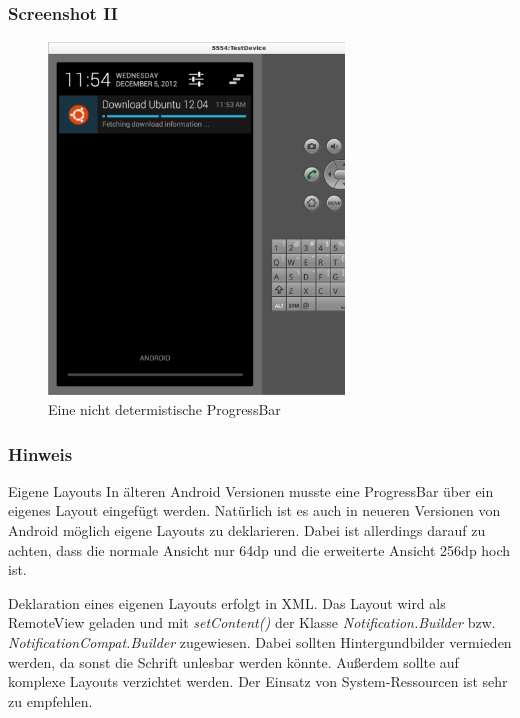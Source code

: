 \begin{frame}
   \frametitle{Screenshot II}
   \begin{figure}[h!]
     \centering
     \includegraphics[width=0.7\textwidth]{pictures/indeterminateProgress.ps}
     \caption{
        Eine nicht determistische ProgressBar
     }
     \label{fig:indeterminateProgress}
   \end{figure}
\end{frame}

\begin{frame}
   \frametitle{Hinweis}
   \begin{alertblock}{Eigene Layouts}
      In älteren Android Versionen musste eine ProgressBar über ein eigenes Layout eingefügt werden. 
      Natürlich ist es auch in neueren Versionen von Android möglich eigene Layouts zu deklarieren. 
      Dabei ist allerdings darauf zu achten, dass die normale Ansicht 
      nur 64dp und die erweiterte Ansicht 256dp hoch ist.

      \vspace{5mm}

      Deklaration eines eigenen Layouts erfolgt in XML. Das Layout wird als RemoteView 
      geladen und mit \emph{setContent()} der Klasse \emph{Notification.Builder} bzw. 
      \emph{NotificationCompat.Builder} zugewiesen. Dabei sollten 
      Hintergundbilder vermieden werden, da sonst die Schrift unlesbar werden könnte. 
      Außerdem sollte auf komplexe Layouts verzichtet werden. Der Einsatz von 
      System-Ressourcen ist sehr zu empfehlen.
   \end{alertblock}
\end{frame}
